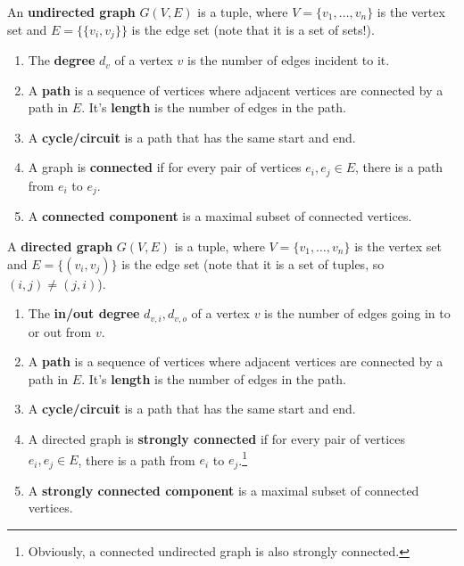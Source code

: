 \documentclass{article}
\begin{document}
    \begin{definition}
      An \textbf{undirected graph} $G(V, E)$ is a tuple, where $V = \{v_1, \ldots, v_n\}$ is the vertex set and $E = \{\{v_i, v_j\}\}$ is the edge set (note that it is a set of sets!). 
      \begin{enumerate}
        \item The \textbf{degree} $d_v$ of a vertex $v$ is the number of edges incident to it. 
        \item A \textbf{path} is a sequence of vertices where adjacent vertices are connected by a path in $E$. It's \textbf{length} is the number of edges in the path. 
        \item A \textbf{cycle/circuit} is a path that has the same start and end. 
        \item A graph is \textbf{connected} if for every pair of vertices $e_i, e_j \in E$, there is a path from $e_i$ to $e_j$. 
        \item A \textbf{connected component} is a maximal subset of connected vertices. 
      \end{enumerate}
    \end{definition}

    \begin{definition}
      A \textbf{directed graph} $G(V, E)$ is a tuple, where $V = \{v_1, \ldots, v_n\}$ is the vertex set and $E = \{(v_i, v_j)\}$ is the edge set (note that it is a set of tuples, so $(i, j) \neq ( j, i)$).
      \begin{enumerate}
        \item The \textbf{in/out degree} $d_{v, i}, d_{v, o}$ of a vertex $v$ is the number of edges going in to or out from $v$. 
        \item A \textbf{path} is a sequence of vertices where adjacent vertices are connected by a path in $E$. It's \textbf{length} is the number of edges in the path. 
        \item A \textbf{cycle/circuit} is a path that has the same start and end. 
        \item A directed graph is \textbf{strongly connected} if for every pair of vertices $e_i, e_j \in E$, there is a path from $e_i$ to $e_j$.\footnote{Obviously, a connected undirected graph is also strongly connected.}
        \item A \textbf{strongly connected component} is a maximal subset of connected vertices. 
      \end{enumerate}
    \end{definition}
\end{document}
